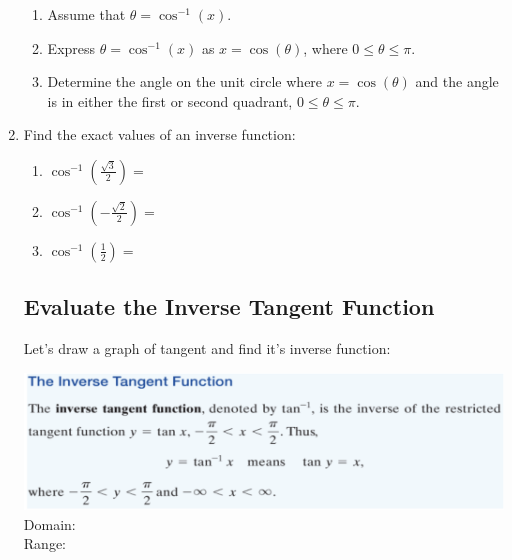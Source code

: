 \begin{enumerate}
{{     \begin{enumerate}
     \item Assume that $\theta = \cos^{-1}(x)$.
     \item Express $\theta = \cos^{-1}(x)$ as $x=\cos(\theta)$, where
       $0 \leq \theta \leq \pi$.
     \item Determine the angle on the unit circle where
       $x=\cos(\theta)$ and the angle is in either the first or second
       quadrant, $0 \leq \theta \leq \pi$.
     \end{enumerate}

   }
 }




\vspace{-.1in}
\item Find the exact values of an inverse function:
 \begin{enumerate}
\item $\displaystyle \cos^{-1}\left(\frac{\sqrt{3}}{2}\right)=$\\[.5in]

\item $\displaystyle \cos^{-1}\left(-\frac{\sqrt{2}}{2}\right)=$\\[.5in]

\item $\displaystyle \cos^{-1}\left(\frac{1}{2}\right)=$\\[.5in]

\end{enumerate}




\subsection{Evaluate the Inverse Tangent Function}

Let's draw a graph of tangent and find it's inverse function:
\vfill

\includegraphics[scale=.7]{tangentinverse}\\
\noindent Domain:\\[.5in]
\noindent Range:\\


\end{enumerate}
